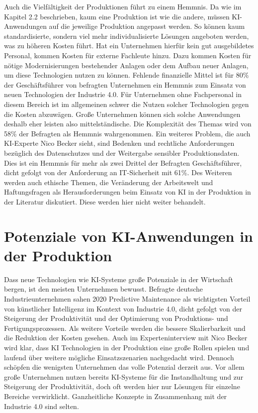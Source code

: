 \documentclass[a4paper,12pt, german]{report}
\begin{document}
Auch die Vielfältigkeit der Produktionen führt zu einem Hemmnis. Da wie im Kapitel 2.2 beschrieben, kaum eine Produktion ist wie die andere, müssen KI-Anwendungen auf die jeweilige Produktion angepasst werden. So können kaum standardisierte, sondern viel mehr individualisierte Lösungen angeboten werden, was zu höheren Kosten führt. Hat ein Unternehmen hierfür kein gut ausgebildetes Personal, kommen Kosten für externe Fachleute hinzu. Dazu kommen Kosten für nötige Modernisierungen bestehender Anlagen oder dem Aufbau neuer Anlagen, um diese Technologien nutzen zu können. Fehlende finanzielle Mittel ist für 80\% der Geschäftsführer von befragten Unternehmen ein Hemmnis zum Einsatz von neuen Technologien der Industrie 4.0. Für Unternehmen ohne Fachpersonal in diesem Bereich ist im allgemeinen schwer die Nutzen solcher Technologien gegen die Kosten abzuwägen. Große Unternehmen können sich solche Anwendungen deshalb eher leisten also mittelständische. Die Komplexität des Themas wird von 58\% der Befragten als Hemmnis wahrgenommen. Ein weiteres Problem, die auch KI-Experte Nico Becker sieht, sind Bedenken und rechtliche Anforderungen bezüglich des Datenschutzes und der Weitergabe sensibler Produktionsdaten. Dies ist ein Hemmnis für mehr als zwei Drittel der Befragten Geschäftsführer, dicht gefolgt von der Anforderung an IT-Sicherheit mit 61\%.\cite{35} Des Weiteren werden auch ethische Themen, die Veränderung der Arbeitswelt und Haftungsfragen als Herausforderungen beim Einsatz von KI in der Produktion in der Literatur diskutiert. Diese werden hier nicht weiter behandelt.


\section{Potenziale von KI-Anwendungen in der Produktion}

Dass neue Technologien wie KI-Systeme große Potenziale in der Wirtschaft bergen, ist den meisten Unternehmen bewusst. Befragte deutsche Industrieunternehmen sahen 2020 Predictive Maintenance als wichtigsten Vorteil von künstlicher Intelligenz im Kontext von Industrie 4.0, dicht gefolgt von der Steigerung der Produktivität und der Optimierung von Produktions- und Fertigungsprozessen. Als weitere Vorteile werden die bessere Skalierbarkeit und die Reduktion der Kosten gesehen.\cite{28} \newline Auch im Experteninterview mit Nico Becker wird klar, dass KI Technologien in der Produktion eine große Rollen spielen und laufend über weitere mögliche Einsatzszenarien nachgedacht wird. Dennoch schöpfen die wenigsten Unternehmen das volle Potenzial derzeit aus. Vor allem große Unternehmen nutzen bereits KI-Systeme für die Instandhaltung und zur Steigerung der Produktivität, doch oft werden hier nur Lösungen für einzelne Bereiche verwirklicht. Ganzheitliche Konzepte in Zusammenhang mit der Industrie 4.0 sind selten.\cite{02}
\end{document}
